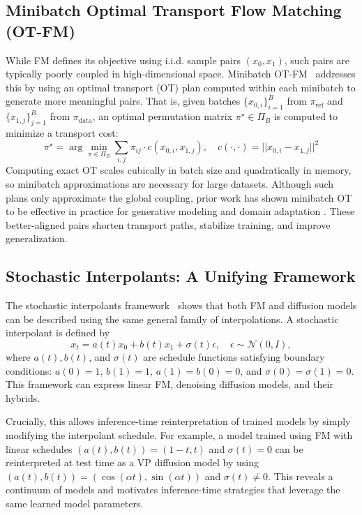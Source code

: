 \documentclass{article}
\begin{document}
\subsection{Minibatch Optimal Transport Flow Matching (OT-FM)}

While FM defines its objective using i.i.d. sample pairs \((x_0, x_1)\), such pairs are typically poorly coupled in high-dimensional space. Minibatch OT-FM~\cite{tong2024otfm} addresses this by using an optimal transport (OT) plan computed within each minibatch to generate more meaningful pairs. That is, given batches \(\{x_{0,i}\}_{i=1}^B\) from \(\pi_{\mathrm{ref}}\) and \(\{x_{1,j}\}_{j=1}^B\) from \(\pi_{\mathrm{data}}\), an optimal permutation matrix \(\pi^\star \in \Pi_B\) is computed to minimize a transport cost:
\[
\pi^\star = \arg\min_{\pi \in \Pi_B} \sum_{i,j} \pi_{ij} \cdot c(x_{0,i}, x_{1,j}), \quad c(\cdot,\cdot) = || x_{0,i} - x_{1,j} ||^2
\]
Computing exact OT scales cubically in batch size and quadratically in memory, so minibatch approximations are necessary for large datasets. Although such plans only approximate the global coupling, prior work has shown minibatch OT to be effective in practice for generative modeling and domain adaptation \cite{tong2024otfm}. These better-aligned pairs shorten transport paths, stabilize training, and improve generalization.

\subsection{Stochastic Interpolants: A Unifying Framework}

The stochastic interpolants framework~\cite{ma2024sit} shows that both FM and diffusion models can be described using the same general family of interpolations. A stochastic interpolant is defined by
\[
x_t = a(t) x_0 + b(t) x_1 + \sigma(t) \epsilon, \quad \epsilon \sim \mathcal{N}(0, I),
\]
where \(a(t), b(t)\), and \(\sigma(t)\) are schedule functions satisfying boundary conditions: \(a(0) = 1\), \(b(1) = 1\), \(a(1) = b(0) = 0\), and \(\sigma(0) = \sigma(1) = 0\). This framework can express linear FM, denoising diffusion models, and their hybrids.

Crucially, this allows inference-time reinterpretation of trained models by simply modifying the interpolant schedule. For example, a model trained using FM with linear schedules \((a(t), b(t)) = (1 - t, t)\) and \(\sigma(t) = 0\) can be reinterpreted at test time as a VP diffusion model by using \((a(t), b(t)) = (\cos(\alpha t), \sin(\alpha t))\) and \(\sigma(t) \neq 0\). This reveals a continuum of models and motivates inference-time strategies that leverage the same learned model parameters.
\end{document}
